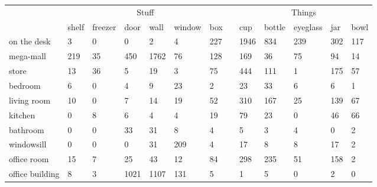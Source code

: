 \documentclass{article}
\begin{document}
\begin{table*}[ht]
\centering
    \begin{tabular}{p{90pt}<{\centering}p{22pt}<{\centering}p{22pt}<{\centering}p{22pt}<{\centering}p{22pt}<{\centering}p{22pt}<{\centering}p{22pt}<{\centering}p{9pt}<{\centering}p{22pt}<{\centering}p{22pt}<{\centering}p{22pt}<{\centering}p{22pt}<{\centering}p{22pt}<{\centering}}
\toprule
\multirow{2}{*}{} & \multicolumn{6}{c}{Stuff}                          &  & \multicolumn{5}{c}{Things}                   \\\cline{2-7}\cline{9-13}
\rule{0pt}{9pt} &  shelf & freezer & door & wall & window & box &  & cup & bottle & eyeglass & jar&  bowl \\ \cline{1-7}\cline{9-13}
\rule{0pt}{9pt}on the desk                     & 3     & 0       & 0          & 2    & 4      & 227 &  & 1946 & 834    & 239      & 302         & 117 \\
\rule{0pt}{9pt}mega-mall                       & 219   & 35      & 450        & 1762 & 76     & 128 &  & 169  & 36     & 75       & 94          & 14  \\
\rule{0pt}{9pt}store                           & 13    & 36      & 5          & 19   & 3      & 75  &  & 444  & 111    & 1        & 175         & 57  \\
\rule{0pt}{9pt}bedroom                         & 6     & 0       & 4          & 9    & 23     & 2   &  & 23   & 33     & 6        & 6           & 1   \\
\rule{0pt}{9pt}living room                     & 10    & 0       & 7          & 14   & 19     & 52  &  & 310  & 167    & 25       & 139         & 67  \\
\rule{0pt}{9pt}kitchen                         & 0     & 8       & 6          & 4    & 4      & 19  &  & 79   & 23     & 0        & 46          & 66  \\
\rule{0pt}{9pt}bathroom                        & 0     & 0       & 33         & 31   & 8      & 4   &  & 5    & 3      & 4        & 0           & 2   \\
\rule{0pt}{9pt}windowsill                      & 0     & 0       & 0          & 31   & 209    & 4   &  & 17   & 8      & 8        & 17          & 2   \\
\rule{0pt}{9pt}office room                       & 15    & 7       & 25         & 43   & 12     & 84  &  & 298  & 235    & 51       & 158         & 2   \\
\rule{0pt}{9pt}office building                 & 8     & 3       & 1021       & 1107 & 131    & 5   &  & 1    & 5      & 0        & 2           & 0   \\

\end{tabular}
\end{table*}
\end{document}
